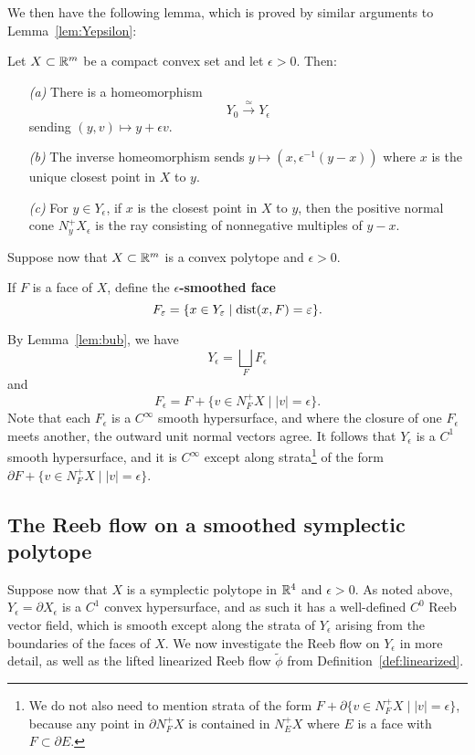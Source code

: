 We then have the following lemma, which is proved by similar arguments to Lemma~\ref{lem:Yepsilon}:

\begin{lemma}
\label{lem:bub}
Let $X\subset{\mathbb R}^m$ be a compact convex set and let $\epsilon>0$. Then:
\begin{itemize}
\item[\emph{(a)}]
There is a homeomorphism
\[
Y_0\stackrel{\simeq}{\longrightarrow} Y_\epsilon
\]
sending $(y,v)\mapsto y+\epsilon v$.
\item[\emph{(b)}]
The inverse homeomorphism sends $y\mapsto (x,\epsilon^{-1}(y-x))$ where $x$ is the unique closest point in $X$ to $y$.
\item[\emph{(c)}]
For $y\in Y_\epsilon$, if $x$ is the closest point in $X$ to $y$, then the positive normal cone $N_y^+X_\epsilon$ is the ray consisting of nonnegative multiples of $y-x$.
\end{itemize}\end{lemma}

Suppose now that $X\subset{\mathbb R}^m$ is a convex polytope and $\epsilon>0$.

\begin{definition}
If $F$ is a face of $X$, define the {\bf $\epsilon$-smoothed face\/}
\[
F_\varepsilon = \{x \in Y_\varepsilon \mid \operatorname{dist}(x,F)=\varepsilon\}.
\]
\end{definition}

By Lemma~\ref{lem:bub}, we have
\[
Y_\epsilon = \bigsqcup_F F_\epsilon
\]
and
\[
F_\epsilon = F + \{v\in N_F^+X\mid |v|=\epsilon\}.
\]
Note that each $F_\epsilon$ is a $C^\infty$ smooth hypersurface, and where the closure of one $F_\epsilon$ meets another, the outward unit normal vectors agree. It follows that $Y_\epsilon$ is a $C^1$ smooth hypersurface, and it is $C^\infty$ except along strata\footnote{We do not also need to mention strata of the form $F+\partial \{v\in N_F^+X\mid |v|=\epsilon\}$, because any point in $\partial N_F^+X$ is contained in $N_E^+X$ where $E$ is a face with $F\subset \partial E$.} of the form $\partial F + \{v\in N_F^+X\mid |v|=\epsilon\}$.

\subsection{The Reeb flow on a smoothed symplectic polytope}
\label{sec:Rfssp}

Suppose now that $X$ is a symplectic polytope in ${\mathbb R}^4$ and $\epsilon>0$. As noted above, $Y_\epsilon = \partial X_\epsilon$ is a $C^1$ convex hypersurface, and as such it has a well-defined $C^0$ Reeb vector field, which is smooth except along the strata of $Y_\epsilon$ arising from the boundaries of the faces of $X$. We now investigate the Reeb flow on $Y_\epsilon$ in more detail, as well as the lifted linearized Reeb flow $\widetilde{\phi}$ from Definition~\ref{def:linearized}.

